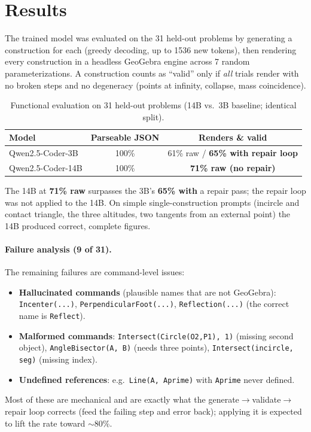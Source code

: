 \documentclass[11pt]{article}
\newcommand{\code}[1]{\texttt{#1}}
\begin{document}
\section{Results}
The trained model was evaluated on the 31 held-out problems by generating a construction for
each (greedy decoding, up to 1536 new tokens), then rendering every construction in a headless
GeoGebra engine across 7 random parameterizations. A construction counts as ``valid'' only if
\emph{all} trials render with no broken steps and no degeneracy (points at infinity, collapse,
mass coincidence).

\begin{table}[h]
\centering
\caption{Functional evaluation on 31 held-out problems (14B vs.\ 3B baseline; identical split).}
\begin{tabular}{lcc}
\toprule
\textbf{Model} & \textbf{Parseable JSON} & \textbf{Renders \& valid} \\
\midrule
Qwen2.5-Coder-3B  & 100\% & 61\% raw / \textbf{65\% with repair loop} \\
Qwen2.5-Coder-14B & 100\% & \textbf{71\% raw (no repair)} \\
\bottomrule
\end{tabular}
\end{table}

The 14B at \textbf{71\% raw} surpasses the 3B's \textbf{65\% with} a repair pass; the repair
loop was not applied to the 14B. On simple single-construction prompts (incircle and contact
triangle, the three altitudes, two tangents from an external point) the 14B produced correct,
complete figures.

\paragraph{Failure analysis (9 of 31).} The remaining failures are command-level issues:
\begin{itemize}[noitemsep]
  \item \textbf{Hallucinated commands} (plausible names that are not GeoGebra): \code{Incenter(...)},
        \code{PerpendicularFoot(...)}, \code{Reflection(...)} (the correct name is \code{Reflect}).
  \item \textbf{Malformed commands}: \code{Intersect(Circle(O2,P1), 1)} (missing second object),
        \code{AngleBisector(A, B)} (needs three points), \code{Intersect(incircle, seg)} (missing index).
  \item \textbf{Undefined references}: e.g.\ \code{Line(A, Aprime)} with \code{Aprime} never defined.
\end{itemize}
Most of these are mechanical and are exactly what the generate$\rightarrow$validate$\rightarrow$repair
loop corrects (feed the failing step and error back); applying it is expected to lift the rate
toward $\sim$80\%.
\end{document}
